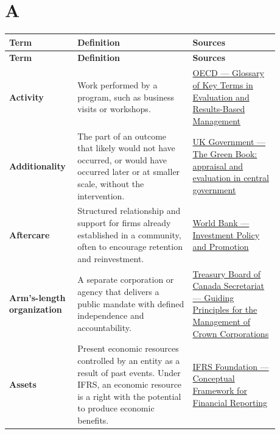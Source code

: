 \documentclass[11pt,letterpaper,oneside,openany]{book}
\begin{document}
\section[A]{A}
\begin{center}
\small
\setlength{\LTpre}{0.4em}
\setlength{\LTpost}{0.8em}
\begin{longtable}{>{\RaggedRight\arraybackslash}p{0.180\linewidth}>{\RaggedRight\arraybackslash}p{0.400\linewidth}>{\RaggedRight\arraybackslash}p{0.300\linewidth}}
\rowcolor{DeepNavy}
\color{white}\bfseries Term & \color{white}\bfseries Definition & \color{white}\bfseries Sources \\
\endfirsthead
\rowcolor{DeepNavy}
\color{white}\bfseries Term & \color{white}\bfseries Definition & \color{white}\bfseries Sources \\
\endhead
\textbf{Activity} & Work performed by a program, such as business visits or workshops. & \href{https://www.oecd.org/en/publications/glossary-of-key-terms-in-evaluation-and-results-based-management-for-sustainable-development-second-edition\_632da462-en-fr-es.html}{OECD --- Glossary of Key Terms in Evaluation and Results-Based Management} \\
\textbf{Additionality} & The part of an outcome that likely would not have occurred, or would have occurred later or at smaller scale, without the intervention. & \href{https://www.gov.uk/government/publications/the-green-book-appraisal-and-evaluation-in-central-government/the-green-book-2026}{UK Government --- The Green Book: appraisal and evaluation in central government} \\
\textbf{Aftercare} & Structured relationship and support for firms already established in a community, often to encourage retention and reinvestment. & \href{https://www.worldbank.org/en/topic/investment-climate/brief/investment-policy-and-promotion}{World Bank --- Investment Policy and Promotion} \\
\textbf{Arm's-length organization} & A separate corporation or agency that delivers a public mandate with defined independence and accountability. & \href{https://www.canada.ca/en/treasury-board-secretariat/services/guidance-crown-corporations/guiding-principles-management-crown-corporations.html}{Treasury Board of Canada Secretariat --- Guiding Principles for the Management of Crown Corporations} \\
\textbf{Assets} & Present economic resources controlled by an entity as a result of past events. Under IFRS, an economic resource is a right with the potential to produce economic benefits. & \href{https://www.ifrs.org/issued-standards/list-of-standards/conceptual-framework/?headerSearchOption=phrase}{IFRS Foundation --- Conceptual Framework for Financial Reporting} \\
\end{longtable}
\end{center}
\end{document}
